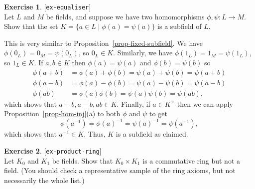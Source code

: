 \documentclass{amsart}
\newcommand{\st}        {\;|\;}
\newcommand{\tm}        {\times}
\renewcommand{\:}{\colon}
\newcommand{\lastexlabel}{}
\newcommand{\exlabel}[1]{
 \global\def\lastexlabel{#1}\label{#1}[\texttt{#1}]\ \\
}
\newcommand{\exlabel}[1]{
 \global\def\lastexlabel{#1}\label{#1}
}
\newenvironment{solution}{\SolutionInline}{\endSolutionInline}
\theoremstyle{definition}
\newtheorem{exercise}{Exercise}[section]
\renewenvironment{solution}{\SolutionAtEnd}{\endSolutionAtEnd}
\begin{document}
\begin{exercise}\exlabel{ex-equaliser}
 Let $L$ and $M$ be fields, and suppose we have two homomorphisms
 $\phi,\psi\:L\to M$.  Show that the set
 $K=\{a\in L\st\phi(a)=\psi(a)\}$ is a subfield of $L$.
\end{exercise}
\begin{solution}
 This is very similar to Proposition~\ref{prop-fixed-subfield}.  We
 have $\phi(0_L)=0_M=\psi(0_L)$, so $0_L\in K$.  Similarly,  we
 have $\phi(1_L)=1_M=\psi(1_L)$, so $1_L\in K$.  If $a,b\in K$ then
 $\phi(a)=\psi(a)$ and $\phi(b)=\psi(b)$ so 
 \begin{align*}
  \phi(a+b) &=\phi(a)+\phi(b)=\psi(a)+\psi(b)=\psi(a+b) \\
  \phi(a-b) &=\phi(a)-\phi(b)=\psi(a)-\psi(b)=\psi(a-b) \\
  \phi(ab)  &=\phi(a)\phi(b)=\psi(a)\psi(b)=\psi(ab),
 \end{align*}
 which shows that $a+b,a-b,ab\in K$.  Finally, if $a\in K^\tm$ then we
 can apply Proposition~\ref{prop-hom-inj}(a) to both $\phi$ and $\psi$
 to get 
 \[ \phi(a^{-1}) = \phi(a)^{-1} = \psi(a)^{-1} =\psi(a^{-1}), \]
 which shows that $a^{-1}\in K$.  Thus, $K$ is a subfield as claimed.
\end{solution}
\begin{exercise}\exlabel{ex-product-ring}
 Let $K_0$ and $K_1$ be fields.  Show that $K_0\tm K_1$ is a
 commutative ring but not a field.  (You should check a representative
 sample of the ring axioms, but not necessarily the whole list.)
\end{exercise}
\end{document}
